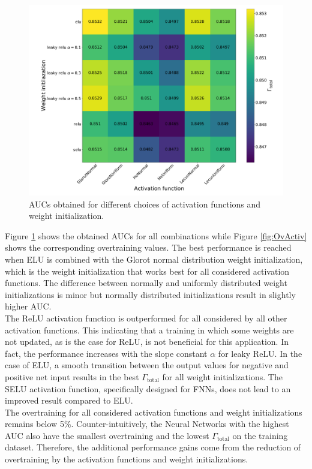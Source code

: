 \begin{figure}[H]
\centering
\includegraphics[width=\linewidth]{figs/FNN/Heat_Activ}
\caption{AUCs obtained for different choices of activation functions and weight initialization.}
\label{fig:HeatActiv}
\end{figure}

Figure \ref{fig:HeatActiv} shows the obtained AUCs for all combinations while Figure \ref{fig:OvActiv} shows the corresponding overtraining values. The best performance is reached when ELU is combined with the Glorot normal distribution weight initialization, which is the weight initialization that works best for all considered activation functions. The difference between normally and uniformly distributed weight initializations is minor but normally distributed initializations result in slightly higher AUC. \\
The ReLU activation function is outperformed for all considered by all other activation functions. This indicating that a training in which some weights are not updated, as is the case for ReLU, is not beneficial for this application. In fact, the performance increases with the slope constant $\alpha$ for leaky ReLU. In the case of ELU, a smooth transition between the output values for negative and positive net input results in the best $\Gamma_{\text{total}}$ for all weight initializations. The SELU activation function, specifically designed for FNNs, does not lead to an improved result compared to ELU. \\
The overtraining for all considered activation functions and weight initializations remains below 5\%. Counter-intuitively, the Neural Networks with the highest AUC also have the smallest overtraining and the lowest $\Gamma_{\text{total}}$ on the training dataset. Therefore, the additional performance gains come from the reduction of overtraining by the activation functions and weight initializations.

